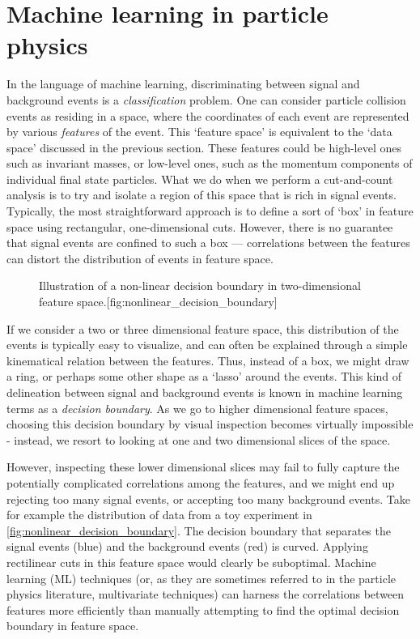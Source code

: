 \section{Machine learning in particle physics}\label{sec:MachineLearning}
In the language of machine learning, discriminating between signal and background events is a \emph{classification} problem. One can consider particle collision events as residing in a space, where the coordinates of each event are represented by various \emph{features} of the event. This `feature space' is equivalent to the `data space' discussed in the previous section. These features could be high-level ones such as invariant masses, or low-level ones, such as the momentum components of individual final state particles. What we do when we perform a cut-and-count analysis is to try and isolate a region of this space that is rich in signal events. Typically, the most straightforward approach is to define a sort of `box' in feature space using rectangular, one-dimensional cuts. However, there is no guarantee that signal events are confined to such a box --- correlations between the features can distort the distribution of events in feature space. 
\strictpagecheck
\begin{figure}
  \begin{sidecaption}{Illustration of a non-linear decision boundary in two-dimensional feature space.}[fig:nonlinear_decision_boundary]
  
\end{sidecaption}
\end{figure}
If we consider a two or three dimensional feature space, this distribution of the events is typically easy to visualize, and can often be explained through a simple kinematical relation between the features. Thus, instead of a box, we might draw a ring, or perhaps some other shape as a `lasso' around the events. This kind of delineation between signal and background events is known in machine learning terms as a \emph{decision boundary}. As we go to higher dimensional feature spaces, choosing this decision boundary by visual inspection becomes virtually impossible - instead, we resort to looking at one and two dimensional slices of the space. 

However, inspecting these lower dimensional slices may fail to fully capture the potentially complicated correlations among the features, and we might end up rejecting too many signal events, or accepting too many background events. Take for example the distribution of data from a toy experiment in \autoref{fig:nonlinear_decision_boundary}. The decision boundary that separates the signal events (blue) and the background events (red) is curved. Applying rectilinear cuts in this feature space would clearly be suboptimal. Machine learning (ML) techniques (or, as they are sometimes referred to in the particle physics literature, multivariate techniques) can harness the correlations between features more efficiently than manually attempting to find the optimal decision boundary in feature space.

